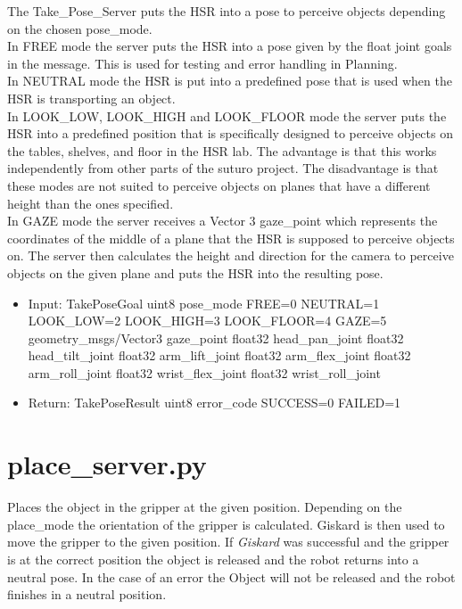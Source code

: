 \documentclass[main.tex]{subfiles}
\begin{document}
			The Take\_Pose\_Server puts the HSR into a pose to perceive objects depending on the chosen pose\_mode. \\
			In FREE mode the server puts the HSR into a pose given by the float joint goals in the message. This is used for testing and error handling in Planning. \\
			In NEUTRAL mode the HSR is put into a predefined pose that is used when the HSR is transporting an object. \\
			In LOOK\_LOW, LOOK\_HIGH and LOOK\_FLOOR mode the server puts the HSR into a predefined position that is specifically designed to perceive objects on the tables, shelves, and floor in the HSR lab. The advantage is that this works independently from other parts of the suturo project. The disadvantage is that these modes are not suited to perceive objects on planes that have a different height than the ones specified. \\
			In GAZE mode the server receives a Vector 3 gaze\_point which represents the coordinates of the middle of a plane that the HSR is supposed to perceive objects on. The server then calculates the height and direction for the camera to perceive objects on the given plane and puts the HSR into the resulting pose.
			
			\begin{itemize}
				\item Input: TakePoseGoal 
				\subitem uint8 pose\_mode
				\subsubitem FREE=0
				\subsubitem NEUTRAL=1
				\subsubitem LOOK\_LOW=2
				\subsubitem LOOK\_HIGH=3
				\subsubitem LOOK\_FLOOR=4
				\subsubitem GAZE=5
				\subitem geometry\_msgs/Vector3 gaze\_point
				\subitem float32 head\_pan\_joint
				\subitem float32 head\_tilt\_joint
				\subitem float32 arm\_lift\_joint
				\subitem float32 arm\_flex\_joint
				\subitem float32 arm\_roll\_joint
				\subitem float32 wrist\_flex\_joint
				\subitem float32 wrist\_roll\_joint
				\item Return: TakePoseResult
				\subitem uint8 error\_code 
				\subsubitem SUCCESS=0
				\subsubitem FAILED=1
			\end{itemize}
			
			
			\section{place\_server.py}  
			Places the object in the gripper at the given position. Depending on the place\_mode the orientation of the gripper is calculated. Giskard is then used to move the gripper to the given position. If \textit{Giskard} was successful and the gripper is at the correct position the object is released and the robot returns into a neutral pose. In the case of an error the Object will not be released and the robot finishes in a neutral position. 
			
\end{document}
